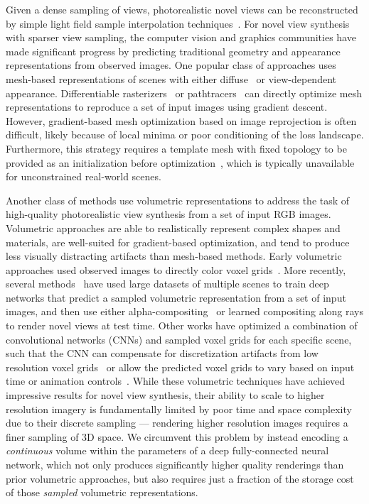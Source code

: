 \documentclass[runningheads]{llncs}
\begin{document}
Given a dense sampling of views, photorealistic novel views can be reconstructed by simple light field sample interpolation techniques~\cite{levoy96,cohen96,davis12}. For novel view synthesis with sparser view sampling, the computer vision and graphics communities have made significant progress by predicting traditional geometry and appearance representations from observed images.
One popular class of approaches uses mesh-based representations of scenes with either diffuse~\cite{waechter14} or view-dependent~\cite{buehler01,debevec96,wood00} appearance.
Differentiable rasterizers~\cite{dibr,genova18,softras,opendr} or pathtracers~\cite{redner,Mitsuba2} can directly optimize mesh representations to reproduce a set of input images using gradient descent.
However, gradient-based mesh optimization based on image reprojection is often difficult, likely because of local minima or poor conditioning of the loss landscape. Furthermore, this strategy requires a template mesh with fixed topology to be provided as an initialization before optimization~\cite{redner}, which is typically unavailable for unconstrained real-world scenes.

Another class of methods use volumetric representations to address the task of high-quality photorealistic view synthesis from a set of input RGB images.
Volumetric approaches are able to realistically represent complex shapes and materials, are well-suited for gradient-based optimization, and tend to produce less visually distracting artifacts than mesh-based methods.
Early volumetric approaches used observed images to directly color voxel grids~\cite{kutulakos00,seitz99,szeliski98}. More recently, several methods~\cite{flynn19,henzler18,kar17,mildenhall19,penner17,srinivasan19,tulsiani17,zhou18} have used large datasets of multiple scenes to train deep networks that predict a sampled volumetric representation from a set of input images, and then use either alpha-compositing~\cite{porter84} or learned compositing along rays to render novel views at test time.
Other works have optimized a combination of convolutional networks (CNNs) and sampled voxel grids for each specific scene, such that the CNN can compensate for discretization artifacts from low resolution voxel grids~\cite{deepvoxels} or allow the predicted voxel grids to vary based on input time or animation controls~\cite{neuralvolumes}.
While these volumetric techniques have achieved impressive results for novel view synthesis, their ability to scale to higher resolution imagery is fundamentally limited by poor time and space complexity due to their discrete sampling --- rendering higher resolution images requires a finer sampling of 3D space.
We circumvent this problem by instead encoding a \emph{continuous} volume within the parameters of a deep fully-connected neural network, which not only produces significantly higher quality renderings than prior volumetric approaches, but also requires just a fraction of the storage cost of those \emph{sampled} volumetric representations.
\end{document}

